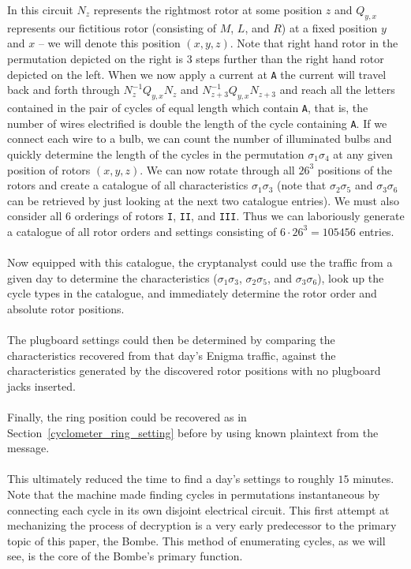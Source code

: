 In this circuit $N_z$ represents the rightmost rotor at some position
$z$ and $Q_{y,x}$ represents our fictitious rotor (consisting of $M$,
$L$, and $R$) at a fixed position $y$ and $x$ -- we will denote this
position $(x,y,z)$. Note that right hand
rotor in the permutation depicted on the right is 3 steps further
than the right hand rotor depicted on the left. When we now apply a
current at \texttt{A} the current will travel back and forth through
$N^{-1}_zQ_{y,x}N_z$ and $N^{-1}_{z+3}Q_{y,x}N_{z+3}$ and reach all
the letters contained
in the pair of cycles of equal length which contain \texttt{A}, that
is, the number of wires electrified is double the length of the cycle
containing \texttt{A}. If we connect each wire to a bulb, we can
count the number of illuminated bulbs and quickly determine the length of
the cycles in the permutation $\sigma_1\sigma_{4}$ at any given
position of rotors $(x,y,z)$. We can now rotate through all
$26^3$ positions of the rotors and create a catalogue of all
characteristics $\sigma_1\sigma_3$ (note that $\sigma_2\sigma_5$ and
  $\sigma_3\sigma_6$ can be retrieved by just looking at the next two
catalogue entries). We must also consider all 6 orderings of rotors
\texttt{I}, \texttt{II}, and \texttt{III}. Thus we can laboriously
generate a catalogue of all rotor orders and settings consisting of
$6\cdot 26^3 = 105456$ entries.
\\\\Now equipped with this catalogue, the cryptanalyst could use the
traffic from a given day to determine the characteristics ($\sigma_1\sigma_3$, $\sigma_2\sigma_5$, and $\sigma_3\sigma_6$), look up
the cycle types in the catalogue, and immediately determine the rotor order and
absolute rotor positions. 
\\\\The plugboard settings could then be
determined by comparing the characteristics recovered from that day's Enigma
traffic, against the characteristics generated by the discovered rotor
positions with no plugboard jacks inserted. 
\\\\Finally, the ring position
could be recovered as in Section~\ref{cyclometer_ring_setting} before by using known plaintext from
the message. 
\\\\This ultimately reduced the time to find a day's
settings to roughly $15$ minutes. Note that the machine made finding cycles in permutations
instantaneous by connecting each cycle in its own disjoint electrical
circuit. This first attempt at mechanizing the process of decryption
is a very early predecessor to the primary topic of this paper, the
Bombe. This method of enumerating cycles, as we will see, is the core
of the Bombe's primary function.
